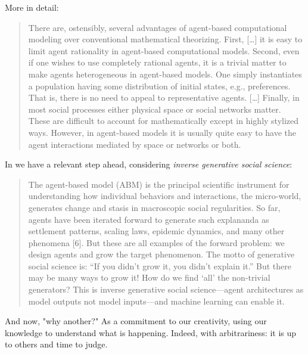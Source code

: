 \documentclass[graybox]{svmult}
\begin{document}
More in detail:
\begin{quote} 
There are, ostensibly, several advantages of agent-based computational modeling over conventional mathematical theorizing. First, [\ldots] it is easy to limit agent rationality in agent-based computational models. Second, even if one wishes to use completely rational agents, it is a trivial matter to make agents heterogeneous in agent-based models. One simply instantiates a population having some distribution of initial states, e.g., preferences. That is, there is no need to appeal to representative agents. [\ldots] Finally, in most social processes either physical space or social networks matter. These are difficult to account for mathematically except in highly stylized ways. However, in agent-based models it is usually quite easy to have the agent interactions mediated by space or networks or both.
\end{quote}

In \cite{inverseGen} we have a relevant step ahead, considering \emph{inverse generative social science}:
\begin{quote} 
The agent-based model (ABM) is the principal scientific instrument for understanding how individual behaviors and interactions, the micro-world, generates change and stasis in macroscopic social regularities. So far, agents have been iterated forward to generate such explananda as settlement patterns, scaling laws, epidemic dynamics, and many other phenomena [6]. But these are all examples of the forward problem: we design agents and grow the target phenomenon. The motto of generative social science is: ``If you didn't grow it, you didn't explain it.'' \cite{epstein1999agent} 
But there may be many ways to grow it! How do we find `all' the non-trivial generators? This is inverse generative social science---agent architectures as model outputs not model inputs---and machine learning can enable it.
\end{quote} 

And now, "why another?" As a commitment to our creativity, using our knowledge to understand what is happening. Indeed, with arbitrariness: it is up to others and time to judge.
\end{document}
